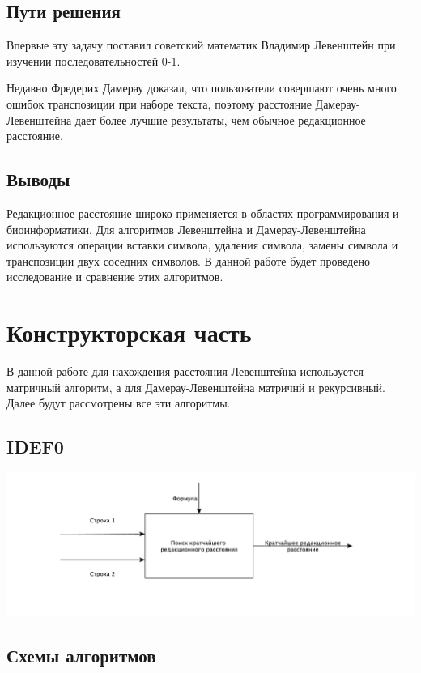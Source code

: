 \documentclass[a4paper,12pt]{article}
\begin{document}
\subsection{Пути решения}

Впервые эту задачу поставил советский математик Владимир Левенштейн при
изучении последовательностей 0-1.

Недавно Фредерих Дамерау доказал, что пользователи совершают очень много
ошибок транспозиции при наборе текста, поэтому расстояние
Дамерау-Левенштейна дает более лучшие результаты, чем обычное редакционное
расстояние.

\subsection{Выводы}

Редакционное расстояние широко применяется в областях программирования и
биоинформатики. Для алгоритмов Левенштейна и Дамерау-Левенштейна
используются операции вставки символа, удаления символа, замены символа и
транспозиции двух соседних символов. В данной работе будет проведено
исследование и сравнение этих алгоритмов.

\newpage
\section{Конструкторская часть}

В данной работе для нахождения расстояния Левенштейна используется матричный
алгоритм, а для Дамерау-Левенштейна матричнй и рекурсивный. Далее будут
рассмотрены все эти алгоритмы.

\subsection{IDEF0}

\begin{center}
    \includegraphics[scale=0.5]{IDEF0}
\end{center}

\subsection{Схемы алгоритмов}
\end{document}
